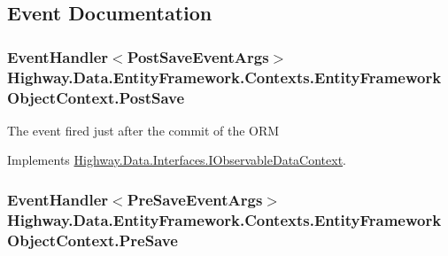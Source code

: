 \subsection{Event Documentation}
\hypertarget{class_highway_1_1_data_1_1_entity_framework_1_1_contexts_1_1_entity_framework_object_context_ad5a527da395401a50839ae936576b9d9}{
\subsubsection[{Post\-Save}]{\setlength{\rightskip}{0pt plus 5cm}Event\-Handler$<${\bf Post\-Save\-Event\-Args}$>$ Highway.\-Data.\-Entity\-Framework.\-Contexts.\-Entity\-Framework\-Object\-Context.\-Post\-Save}}\label{class_highway_1_1_data_1_1_entity_framework_1_1_contexts_1_1_entity_framework_object_context_ad5a527da395401a50839ae936576b9d9}


The event fired just after the commit of the O\-R\-M 



Implements \hyperlink{interface_highway_1_1_data_1_1_interfaces_1_1_i_observable_data_context_a1978b914f7b94a37a6e86f3314326ca9}{Highway.\-Data.\-Interfaces.\-I\-Observable\-Data\-Context}.

\hypertarget{class_highway_1_1_data_1_1_entity_framework_1_1_contexts_1_1_entity_framework_object_context_a0c33a6b51babf17fcc2d61e396dd8bf9}{
\subsubsection[{Pre\-Save}]{\setlength{\rightskip}{0pt plus 5cm}Event\-Handler$<${\bf Pre\-Save\-Event\-Args}$>$ Highway.\-Data.\-Entity\-Framework.\-Contexts.\-Entity\-Framework\-Object\-Context.\-Pre\-Save}}\label{class_highway_1_1_data_1_1_entity_framework_1_1_contexts_1_1_entity_framework_object_context_a0c33a6b51babf17fcc2d61e396dd8bf9}


